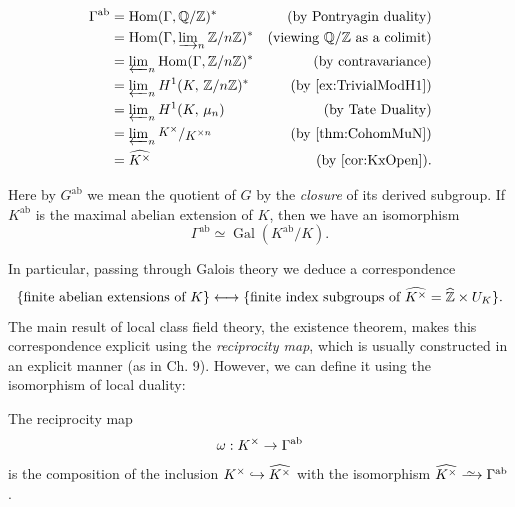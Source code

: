 \documentclass[a4paper, oneside]{memoir}
\begin{document}
\begin{align*}
	\Gamma^{\text{ab}} & = \Hom(\Gamma, \Q/\Z)^*                                    & \text{(by Pontryagin duality)}        \\
	                   & = \Hom(\Gamma, \varinjlim_n\nolimits \Zn)^*                & \text{(viewing $\Q/\Z$ as a colimit)} \\
	                   & = \varprojlim_n\nolimits \Hom(\Gamma, \Zn)^*               & \text{(by contravariance)}            \\
	                   & = \varprojlim_n\nolimits \H{1}{K}{\Zn}^*                   & \text{(by \ref{ex:TrivialModH1})}     \\
	                   & = \varprojlim_n\nolimits \H{1}{K}{\mu_n}                   & \text{(by Tate Duality)}              \\
	                   & = \varprojlim_n\nolimits \sfrac{K^{\times}}{\K^{\times n}} & \text{(by \ref{thm:CohomMuN})}        \\
	                   & = \widehat{\K^\times}                                      & \text{(by \ref{cor:KxOpen})}.
\end{align*}

\begin{remark}
	Here by $G^{\text{ab}}$ we mean the quotient of $G$ by the \textit{closure} of its derived subgroup. If $K^{\text{ab}}$ is the maximal abelian extension of $K$, then we have an isomorphism
	\[
		\Gamma^{\text{ab}} \simeq \operatorname{Gal}(K^{\text{ab}}/K).
	\]
\end{remark}
\noindent In particular, passing through Galois theory we deduce a correspondence
\begin{equation}\label{eq:ClassField}
	\{\text{finite abelian extensions of }K\} \longleftrightarrow \{\text{finite index subgroups of }\widehat{K^\times} = \widehat{\mathbb{Z}} \times U_K\}
	.\end{equation}
The main result of local class field theory, the existence theorem, makes this correspondence explicit using the \textit{reciprocity map}, which is usually constructed in an explicit manner (as in \cite{Harari} Ch. 9). However, we can define it using the isomorphism of local duality:

\begin{definition}
	The reciprocity map
	\[
		\omega:K^\times \to \Gamma^{\text{ab}}
	\]
	is the composition of the inclusion $K^\times \hookrightarrow \widehat{K^\times}$ with the isomorphism $\widehat{\K^\times} \Iso \Gamma^{\text{ab}}$.
\end{definition}
\end{document}
